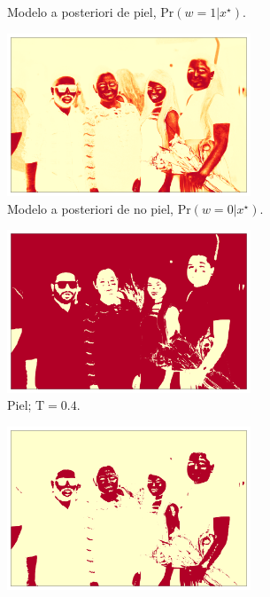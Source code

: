 \begin{figure}[ht!]
\begin{subfigure}{0.4\textwidth}
        \caption{Modelo a posteriori de piel, $\text{Pr}(w=1 | x^{\star})$.}
    \end{subfigure}
    \hspace{1cm}
    \begin{subfigure}{0.4\textwidth}
        \centering
        \includegraphics[width=0.8\textwidth]{../figures/image6/image_06_postbg.png}
        \caption{Modelo a posteriori de no piel, $\text{Pr}(w=0 | x^{\star})$.}
    \end{subfigure}
    \begin{subfigure}{0.4\textwidth}
        \centering
        \includegraphics[width=0.8\textwidth]{../figures/image6/image_06_treshskin_40percent.png}
        \caption{Piel; $\text{T} = 0.4$.}
    \end{subfigure}
    \hspace{1cm}
    \begin{subfigure}{0.4\textwidth}
        \centering
        \includegraphics[width=0.8\textwidth]{../figures/image6/image_06_treshbg_40percent.png}

\end{subfigure}
\end{figure}
